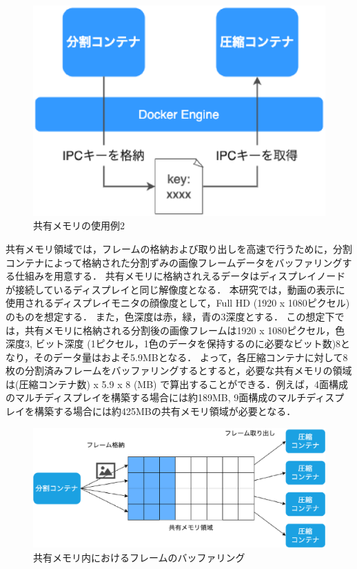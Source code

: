 \begin{figure}[H]
    \hspace*{\fill}
    \includegraphics[width=\linewidth]{./fig/chap3/ipckeyshare.eps}
    \hspace*{\fill}
    \caption{共有メモリの使用例2}
\end{figure}

共有メモリ領域では，フレームの格納および取り出しを高速で行うために，分割コンテナによって格納された分割ずみの画像フレームデータをバッファリングする仕組みを用意する．
共有メモリに格納されえるデータはディスプレイノードが接続しているディスプレイと同じ解像度となる．
本研究では，動画の表示に使用されるディスプレイモニタの顔像度として，Full HD (1920 x 1080ピクセル) のものを想定する．
また，色深度は赤，緑，青の3深度とする．
この想定下では，共有メモリに格納される分割後の画像フレームは1920 x 1080ピクセル，色深度3, ビット深度 (1ピクセル，1色のデータを保持するのに必要なビット数)8となり，そのデータ量はおよそ5.9MBとなる．
よって，各圧縮コンテナに対して8枚の分割済みフレームをバッファリングするとすると，必要な共有メモリの領域は(圧縮コンテナ数) x 5.9 x 8 (MB) で算出することができる．例えば，4面構成のマルチディスプレイを構築する場合には約189MB, 9面構成のマルチディスプレイを構築する場合には約425MBの共有メモリ領域が必要となる．

\begin{figure}[H]
    \hspace*{\fill}
    \includegraphics[width=\linewidth]{./fig/chap3/buffering.eps}
    \hspace*{\fill}
    \caption{共有メモリ内におけるフレームのバッファリング}
\end{figure}

